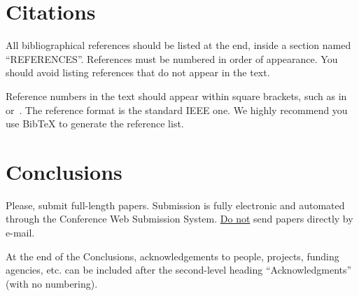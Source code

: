 \documentclass{article}
\begin{document}
\section{Citations}
All bibliographical references should be listed at the end, inside a section named ``REFERENCES''. References must be numbered in order of appearance. You should avoid listing references that do not appear in the text.

Reference numbers in the text should appear within square brackets, such as in~\cite{Someone:00} or~\cite{Someone:00,Someone:04,Someone:09}. The reference format is the standard IEEE one. We highly recommend you use BibTeX 
to generate the reference list.

\section{Conclusions}
Please, submit full-length papers. Submission is fully electronic and automated through the Conference Web Submission System. \underline{Do not} send papers directly by e-mail.


\begin{acknowledgments}
At the end of the Conclusions, acknowledgements to people, projects, funding agencies, etc. can be included after the second-level heading  ``Acknowledgments'' (with no numbering).
\end{acknowledgments} 


\end{document}

